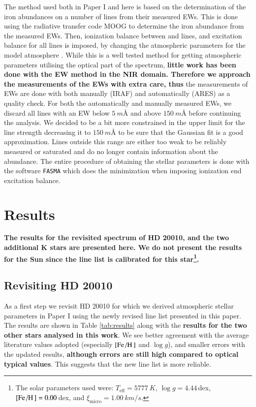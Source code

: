\documentclass{aa}
\begin{document}
The method used both in Paper I and here is based on the determination of the iron abundances on a
number of lines from their measured EWs. This is done using the radiative transfer code MOOG
\citep{Sneden1973} to determine the iron abundance from the measured EWs. Then, ionization balance
between  and  lines, and excitation balance for all  lines is
imposed, by changing the atmospheric parameters for the model atmosphere \citep[][ATLAS9 is used
here]{Kurucz1993}. While this is a well tested method for getting atmospheric parameters utilising
the optical part of the spectrum, {\bf little work has been done with the EW method in the NIR
domain. Therefore we approach the measurements of the EWs with extra care, thus} the measurements of
EWs are done with both manually (IRAF) and automatically (ARES) as a quality check. For both the
automatically and manually measured EWs, we discard all lines with an EW below $\SI{5}{m}$\AA{} and
above $\SI{150}{m}$\AA{} before continuing the analysis. We decided to be a bit more constrained in
the upper limit for the line strength decreasing it to $\SI{150}{m}$\AA{} to be sure that the
Gaussian fit is a good approximation. Lines outside this range are either too weak to be reliably
measured or saturated and do no longer contain information about the abundance. The entire procedure
of obtaining the stellar parameters is done with the software \texttt{FASMA} \citep{Andreasen2017a}
which does the minimization when imposing ionization end excitation balance.




\section{Results}
\label{sec:results}

{\bf The results for the revisited spectrum of HD 20010, and the two additional K stars are
presented here. We do not present the results for the Sun since the line list is calibrated for this
star\footnote{The solar parameters used were: $T_\mathrm{eff}=\SI{5777}{K}$, $\log g=4.44\,$dex,
$[\ion{Fe}/\ion{H}]=0.00\,$dex, and $\xi_\mathrm{micro}=\SI{1.00}{km/s}$.}.}

\subsection{Revisiting HD 20010}
\label{sec:hd20010}

As a first step we revisit HD 20010 for which we derived atmospheric stellar parameters in Paper I
using the newly revised line list presented in this paper. The results are shown in Table
\ref{tab:results} along with the {\bf results for the two other stars analysed in this work}. We see
better agreement with the average literature values adopted (especially $[\ion{Fe}/\ion{H}]$ and
$\log g$), and smaller errors with the updated results, {\bf although errors are still high compared
to optical typical values}. This suggests that the new line list is more reliable.
\end{document}

